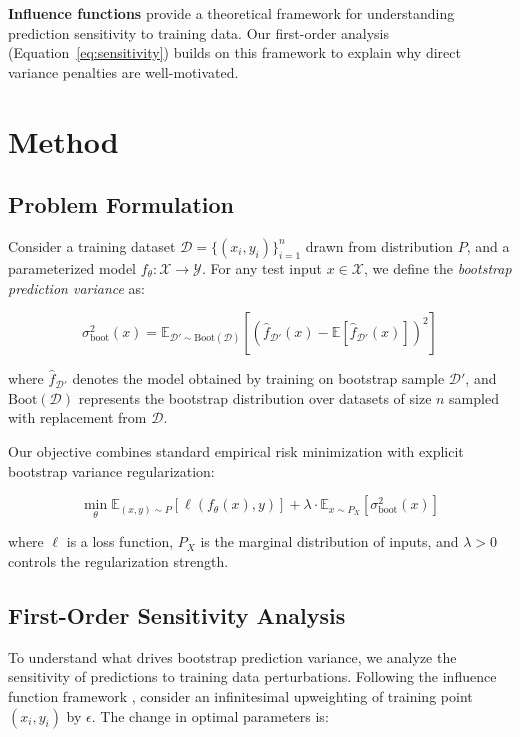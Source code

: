 \documentclass[12pt, letterpaper]{article}
\begin{document}
\textbf{Influence functions} \citep{koh2017understanding} provide a theoretical framework for understanding prediction sensitivity to training data. Our first-order analysis (Equation~\ref{eq:sensitivity}) builds on this framework to explain why direct variance penalties are well-motivated.

\section{Method}

\subsection{Problem Formulation}

Consider a training dataset $\mathcal{D} = \{(x_i, y_i)\}_{i=1}^n$ drawn from distribution $P$, and a parameterized model $f_\theta: \mathcal{X} \rightarrow \mathcal{Y}$. For any test input $x \in \mathcal{X}$, we define the \emph{bootstrap prediction variance} as:

\begin{equation}
\sigma^2_{\text{boot}}(x) = \mathbb{E}_{\mathcal{D}' \sim \text{Boot}(\mathcal{D})}\left[(\hat{f}_{\mathcal{D}'}(x) - \mathbb{E}[\hat{f}_{\mathcal{D}'}(x)])^2\right]
\end{equation}

where $\hat{f}_{\mathcal{D}'}$ denotes the model obtained by training on bootstrap sample $\mathcal{D}'$, and $\text{Boot}(\mathcal{D})$ represents the bootstrap distribution over datasets of size $n$ sampled with replacement from $\mathcal{D}$.

Our objective combines standard empirical risk minimization with explicit bootstrap variance regularization:

\begin{equation}
\min_\theta \mathbb{E}_{(x,y) \sim P}[\ell(f_\theta(x), y)] + \lambda \cdot \mathbb{E}_{x \sim P_X}[\sigma^2_{\text{boot}}(x)]
\end{equation}

where $\ell$ is a loss function, $P_X$ is the marginal distribution of inputs, and $\lambda > 0$ controls the regularization strength.

\subsection{First-Order Sensitivity Analysis}

To understand what drives bootstrap prediction variance, we analyze the sensitivity of predictions to training data perturbations. Following the influence function framework \citep{koh2017understanding}, consider an infinitesimal upweighting of training point $(x_i, y_i)$ by $\epsilon$. The change in optimal parameters is:
\end{document}
